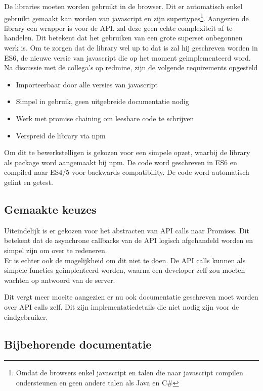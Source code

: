 De libraries moeten worden gebruikt in de browser. Dit er automatisch enkel gebruikt gemaakt kan worden van javascript en zijn supertypes\footnote{Omdat de browsers enkel javascript en talen die naar javascript compilen ondersteunen en geen andere talen als Java en C\#}. Aangezien de library een wrapper is voor de API, zal deze geen echte complexiteit af te handelen. Dit betekent dat het gebruiken van een grote superset onbegonnen werk is. Om te zorgen dat de library wel up to dat is zal hij geschreven worden  in ES6, de nieuwe versie van javascript die op het moment geimplementeerd word. \\

Na discussie met de collega's op redmine, zijn de volgende requirements opgesteld 	 

\begin{itemize}
	\item Importeerbaar door alle versies van javascript
	\item Simpel in gebruik, geen uitgebreide documentatie nodig
	\item Werk met promise chaining om leesbare code te schrijven
	\item Verspreid de library via npm
\end{itemize}

Om dit te bewerkstelligen is gekozen voor een simpele opzet, waarbij de library als package word aangemaakt bij npm. De code word geschreven in ES6 en compiled naar ES4/5 voor backwards compatibility. De code word automatisch gelint en getest.

\subsection{Gemaakte keuzes}

Uiteindelijk is er gekozen voor het abstracten van API calls naar Promises. Dit betekent dat de asynchrone callbacks van de API logisch afgehandeld worden en simpel zijn om over te redeneren. \\

Er is echter ook de mogelijkheid om dit niet te doen. De API calls kunnen als simpele functies geimplenteerd worden, waarna een developer zelf zou moeten wachten op antwoord van de server. 

Dit vergt meer moeite aangezien er nu ook documentatie geschreven moet worden over API calls zelf. Dit zijn implementatiedetails die niet nodig zijn voor de eindgebruiker.

\subsection{Bijbehorende documentatie}

